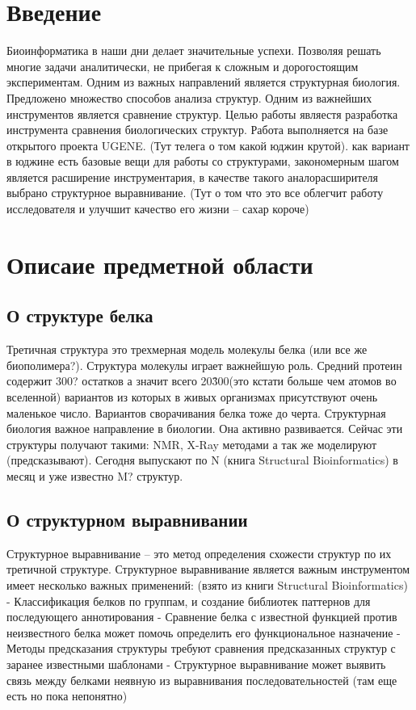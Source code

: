 \documentclass[a4paper, 14pt, titlepage, utf8]{extarticle}
\begin{document}
\section{Введение}	%

Биоинформатика в наши дни делает значительные успехи. Позволяя решать многие задачи аналитически, не прибегая к сложным и дорогостоящим экспериментам. Одним из важных направлений является структурная биология. Предложено множество способов анализа структур. Одним из важнейших инструментов является сравнение структур.
Целью работы являестя разработка инструмента сравнения биологических структур. Работа выполняется на базе открытого проекта UGENE. (Тут телега о том какой юджин крутой). 
как вариант в юджине есть базовые вещи для работы со структурами, закономерным шагом является расширение инструментария, в качестве такого аналорасширителя выбрано структурное выравнивание.
(Тут о том что это все облегчит работу исследователя и улучшит качество его жизни -- сахар короче) 

\section{Описаие предметной области}	%

\subsection{О структуре белка}
Третичная структура это трехмерная модель молекулы белка (или все же биополимера?). Структура молекулы играет важнейшую роль. Средний протеин содержит 300? остатков а значит всего 20\^300(это кстати больше чем атомов во вселенной) вариантов из которых в живых организмах присутствуют очень маленькое число. Вариантов сворачивания белка тоже до черта. Структурная биология важное направление в биологии. Она активно развивается. Сейчас эти структуры получают такими: NMR, X-Ray методами а так же моделируют (предсказывают). Сегодня выпускают по N (книга Structural Bioinformatics) в месяц и уже известно M? структур.

\subsection{О структурном выравнивании}
Структурное выравнивание -- это метод определения схожести структур по их третичной структуре.%
Структурное выравнивание является важным инструментом имеет несколько важных применений:
	(взято из книги Structural Bioinformatics)
	- Классификация белков по группам, и создание библиотек паттернов для последующего аннотирования
	- Сравнение белка с известной функцией против неизвестного белка может помочь определить его функциональное назначение 
	- Методы предсказания структуры требуют сравнения предсказанных структур с заранее известными шаблонами
	- Структурное выравнивание может выявить связь между белками неявную из выравнивания последовательностей (там еще есть но пока непонятно)
\end{document}
